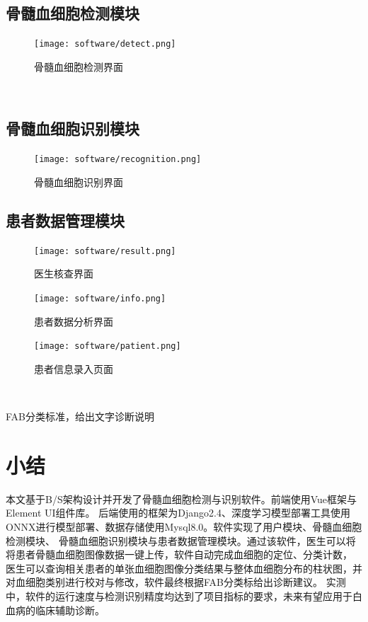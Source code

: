\subsection{骨髓血细胞检测模块}
\begin{figure}[htbp]                     
  \centering                      
  \texttt{[image: software/detect.png]}                      
  \caption{骨髓血细胞检测界面}                      
  \label{fig:interface_detect}       
\end{figure}
\
\subsection{骨髓血细胞识别模块}
\begin{figure}[htbp]                     
  \centering                      
  \texttt{[image: software/recognition.png]}                      
  \caption{骨髓血细胞识别界面}                      
  \label{fig:interface_recog}       
\end{figure}

\subsection{患者数据管理模块}
\begin{figure}[htbp]                     
  \centering                      
  \texttt{[image: software/result.png]}                      
  \caption{医生核查界面}                      
  \label{fig:interface_result}       
\end{figure}

\begin{figure}[htbp]                     
  \centering                      
  \texttt{[image: software/info.png]}                      
  \caption{患者数据分析界面}                      
  \label{fig:interface_info}       
\end{figure}

\begin{figure}[htbp]                     
  \centering                      
  \texttt{[image: software/patient.png]}                      
  \caption{患者信息录入页面}                      
  \label{fig:interface_patient}       
\end{figure}
\

FAB分类标准，给出文字诊断说明

\section{小结}
本文基于B/S架构设计并开发了骨髓血细胞检测与识别软件。前端使用Vue框架与Element UI组件库。
后端使用的框架为Django2.4、深度学习模型部署工具使用ONNX进行模型部署、数据存储使用Mysql8.0。软件实现了用户模块、骨髓血细胞检测模块、
骨髓血细胞识别模块与患者数据管理模块。通过该软件，医生可以将将患者骨髓血细胞图像数据一键上传，软件自动完成血细胞的定位、分类计数，
医生可以查询相关患者的单张血细胞图像分类结果与整体血细胞分布的柱状图，并对血细胞类别进行校对与修改，软件最终根据FAB分类标给出诊断建议。
实测中，软件的运行速度与检测识别精度均达到了项目指标的要求，未来有望应用于白血病的临床辅助诊断。
